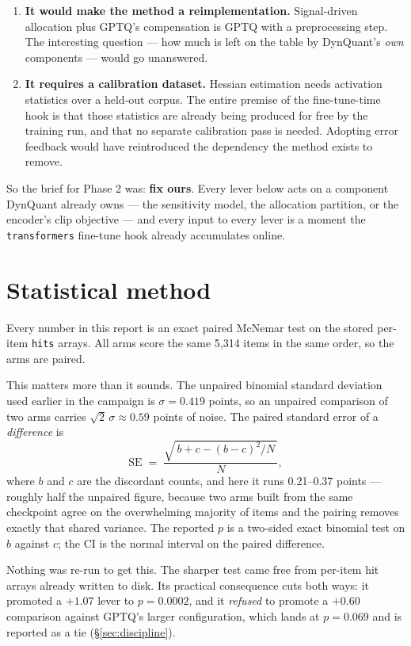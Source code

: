 \documentclass[11pt]{article}
\newcommand{\code}[1]{\texttt{#1}}
\newenvironment{aside}%
{\par\needspace{4\baselineskip}\vspace{0.8ex}%
\begin{lrbox}{\asidebox}\begin{minipage}{\dimexpr\textwidth-18pt\relax}\small}%
{\end{minipage}\end{lrbox}%
\noindent\setlength{\fboxsep}{9pt}\colorbox{warnbg}{\usebox{\asidebox}}%
\vspace{0.6ex}\par}
\begin{document}
\begin{enumerate}[leftmargin=1.4em]
\item \textbf{It would make the method a reimplementation.} Signal-driven allocation plus
GPTQ's compensation is GPTQ with a preprocessing step. The interesting question --- how much is
left on the table by DynQuant's \emph{own} components --- would go unanswered.
\item \textbf{It requires a calibration dataset.} Hessian estimation needs activation statistics
over a held-out corpus. The entire premise of the fine-tune-time hook is that those statistics are
already being produced for free by the training run, and that no separate calibration pass is
needed. Adopting error feedback would have reintroduced the dependency the method exists to
remove.
\end{enumerate}

So the brief for Phase 2 was: \textbf{fix ours}. Every lever below acts on a component DynQuant
already owns --- the sensitivity model, the allocation partition, or the encoder's clip objective
--- and every input to every lever is a moment the \code{transformers} fine-tune hook already
accumulates online.

\section{Statistical method}

Every number in this report is an exact paired McNemar test on the stored per-item \code{hits}
arrays. All arms score the same 5{,}314 items in the same order, so the arms are paired.

This matters more than it sounds. The unpaired binomial standard deviation used earlier in the
campaign is $\sigma = 0.419$ points, so an unpaired comparison of two arms carries
$\sqrt{2}\,\sigma \approx 0.59$ points of noise. The paired standard error of a \emph{difference}
is
\[
\mathrm{SE} \;=\; \frac{\sqrt{\,b + c - (b-c)^2/N\,}}{N},
\]
where $b$ and $c$ are the discordant counts, and here it runs 0.21--0.37 points --- roughly half
the unpaired figure, because two arms built from the same checkpoint agree on the overwhelming
majority of items and the pairing removes exactly that shared variance. The reported $p$ is a
two-sided exact binomial test on $b$ against $c$; the CI is the normal interval on the paired
difference.

\begin{aside}
Nothing was re-run to get this. The sharper test came free from per-item hit arrays already
written to disk. Its practical consequence cuts both ways: it promoted a $+1.07$ lever to
$p = 0.0002$, and it \emph{refused} to promote a $+0.60$ comparison against GPTQ's larger
configuration, which lands at $p = 0.069$ and is reported as a tie (\S\ref{sec:discipline}).
\end{aside}
\end{document}
